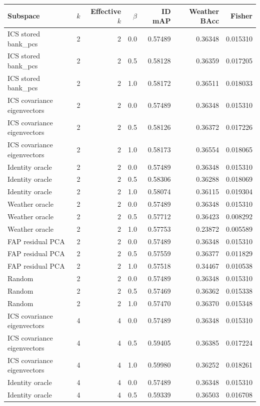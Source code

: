 \begin{tabular}{lrrrrrr}
\toprule
Subspace & $k$ & Effective $k$ & $\beta$ & ID mAP & Weather BAcc & Fisher \\
\midrule
ICS stored bank_pcs & 2 & 2 & 0.0 & 0.57489 & 0.36348 & 0.015310 \\
ICS stored bank_pcs & 2 & 2 & 0.5 & 0.58128 & 0.36359 & 0.017205 \\
ICS stored bank_pcs & 2 & 2 & 1.0 & 0.58172 & 0.36511 & 0.018033 \\
ICS covariance eigenvectors & 2 & 2 & 0.0 & 0.57489 & 0.36348 & 0.015310 \\
ICS covariance eigenvectors & 2 & 2 & 0.5 & 0.58126 & 0.36372 & 0.017226 \\
ICS covariance eigenvectors & 2 & 2 & 1.0 & 0.58173 & 0.36554 & 0.018065 \\
Identity oracle & 2 & 2 & 0.0 & 0.57489 & 0.36348 & 0.015310 \\
Identity oracle & 2 & 2 & 0.5 & 0.58306 & 0.36288 & 0.018069 \\
Identity oracle & 2 & 2 & 1.0 & 0.58074 & 0.36115 & 0.019304 \\
Weather oracle & 2 & 2 & 0.0 & 0.57489 & 0.36348 & 0.015310 \\
Weather oracle & 2 & 2 & 0.5 & 0.57712 & 0.36423 & 0.008292 \\
Weather oracle & 2 & 2 & 1.0 & 0.57753 & 0.23872 & 0.005589 \\
FAP residual PCA & 2 & 2 & 0.0 & 0.57489 & 0.36348 & 0.015310 \\
FAP residual PCA & 2 & 2 & 0.5 & 0.57559 & 0.36377 & 0.011829 \\
FAP residual PCA & 2 & 2 & 1.0 & 0.57518 & 0.34467 & 0.010538 \\
Random & 2 & 2 & 0.0 & 0.57489 & 0.36348 & 0.015310 \\
Random & 2 & 2 & 0.5 & 0.57469 & 0.36362 & 0.015338 \\
Random & 2 & 2 & 1.0 & 0.57470 & 0.36370 & 0.015348 \\
ICS covariance eigenvectors & 4 & 4 & 0.0 & 0.57489 & 0.36348 & 0.015310 \\
ICS covariance eigenvectors & 4 & 4 & 0.5 & 0.59405 & 0.36385 & 0.017224 \\
ICS covariance eigenvectors & 4 & 4 & 1.0 & 0.59980 & 0.36252 & 0.018261 \\
Identity oracle & 4 & 4 & 0.0 & 0.57489 & 0.36348 & 0.015310 \\
Identity oracle & 4 & 4 & 0.5 & 0.59339 & 0.36503 & 0.016708 \\

\end{tabular}
